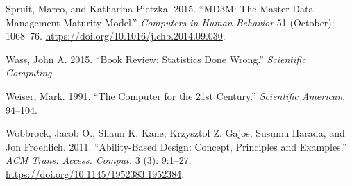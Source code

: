 \begin{CSLReferences}{1}{0}
\leavevmode{}%
Spruit, Marco, and Katharina Pietzka. 2015. {``{MD}3M: The Master Data
Management Maturity Model.''} \emph{Computers in Human Behavior} 51
(October): 1068--76. \url{https://doi.org/10.1016/j.chb.2014.09.030}.

\leavevmode{}%
Wass, John A. 2015. {``Book Review: Statistics Done Wrong.''}
\emph{Scientific Computing}.

\leavevmode{}%
Weiser, Mark. 1991. {``The Computer for the 21st Century.''}
\emph{Scientific American}, 94--104.

\leavevmode{}%
Wobbrock, Jacob O., Shaun K. Kane, Krzysztof Z. Gajos, Susumu Harada,
and Jon Froehlich. 2011. {``Ability-Based Design: Concept, Principles
and Examples.''} \emph{ACM Trans. Access. Comput.} 3 (3): 9:1--27.
\url{https://doi.org/10.1145/1952383.1952384}.

\end{CSLReferences}
